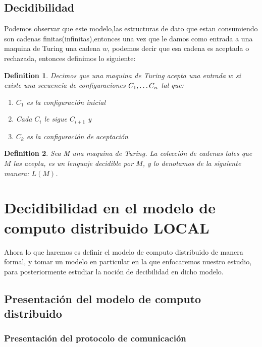 \documentclass[10pt]{report}
\newtheorem{definition}{Definition}
\begin{document}
    \subsection{Decidibilidad}\label{subsec:decidibilidad2}
    Podemos observar que este modelo,las estructuras de dato que estan consumiendo
    son cadenas finitas(infinitas),entonces una vez que le damos como entrada a una maquina de
    Turing una cadena $w$, podemos decir que esa cadena es aceptada o rechazada,
    entonces definimos lo siguiente:
    \theoremstyle{definition}
    \begin{definition}
        Decimos que una maquina de Turing acepta una entrada $w$ si existe una secuencia de configuraciones
        $C_{1},\mathellipsis C_{n}$ tal que:
        \begin{enumerate}
            \item $C_{1}$ es la configuración inicial
            \item Cada $C_{i}$ le sigue $C_{i+1}$ y
            \item $C_{k}$ es la configuración de aceptación

        \end{enumerate}
    \end{definition}

    \theoremstyle{definition}
    \begin{definition}
        Sea M una maquina de Turing.
        La colección de cadenas tales que $M$ las acepta,
        es un lenguaje decidible por $M$, y lo denotamos
        de la siguiente manera: $L(M)$.
    \end{definition}
    \section{Decidibilidad en el modelo de computo distribuido  \textbf{LOCAL}}\label{sec:decidibilidad-en-el-modelo-de-computo-distribuidotextbf}
    Ahora lo que haremos es definir el modelo de computo distribuido de manera formal,
    y tomar un modelo en particular en la que enfocaremos nuestro estudio, para posteriormente
    estudiar la noción de decibilidad en dicho modelo.
    \subsection{Presentación del modelo de computo distribuido}\label{subsec:presentación-del-modelo-de-computo-distrubuido}
    \subsubsection{Presentación del protocolo de comunicación}
\end{document}
